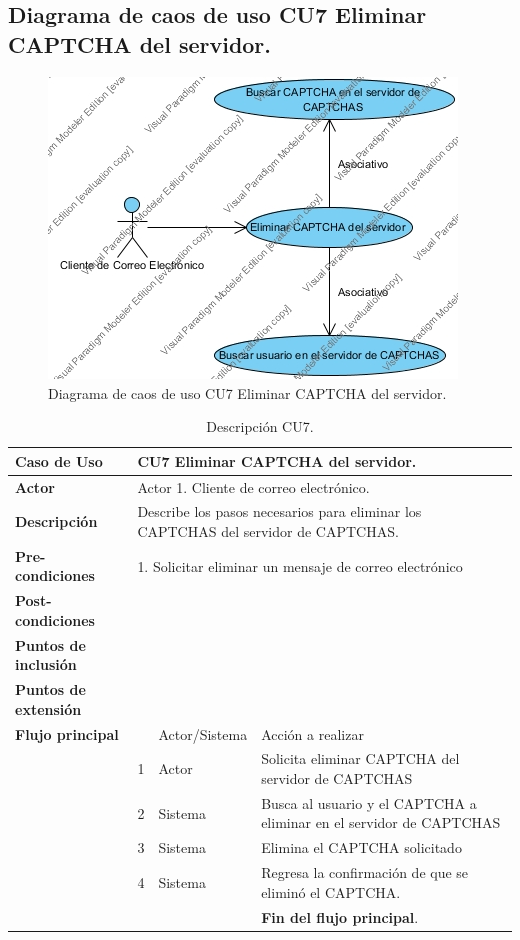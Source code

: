 \documentclass[12pt,oneside,onecolumn,openany]{report}
\begin{document}
\subsection{Diagrama de caos de uso CU7 Eliminar CAPTCHA del servidor.}
\begin{figure}[H]
	\includegraphics[width=1\linewidth, height=8cm]{./images/casodeuso7.jpg}
	\caption{Diagrama de caos de uso CU7 Eliminar CAPTCHA del servidor.}
	\label{fig:4-8-1}
\end{figure}
\begin{table}[H]
 \centering
   {
     \begin{tabular}{| p{} | p{} |p{4cm}|p{5cm}|}
     \hline
     \textbf{Caso de Uso} &\multicolumn{3}{|l|}{CU7 Eliminar CAPTCHA del servidor.}\\
     \hline
     \textbf{Actor} & \multicolumn{3}{|l|}{Actor 1. Cliente de correo electrónico.}\\
     \hline
     \textbf{Descripción} & \multicolumn{3}{|p{10cm}|}{Describe los pasos necesarios para eliminar los CAPTCHAS del servidor de CAPTCHAS.}\\
     \hline
     \textbf{Pre-condiciones} & \multicolumn{3}{|l|}{1. Solicitar eliminar un mensaje de correo electrónico}\\
     \hline
     \textbf{Post-condiciones} & \multicolumn{3}{|l|}{}\\
     \hline
     \textbf{Puntos de inclusión} & \multicolumn{3}{|l|}{}\\
     \hline
     \textbf{Puntos de extensión} & \multicolumn{3}{|l|}{}\\
     \hline
     \textbf{Flujo principal} & & Actor/Sistema & Acción a realizar\\
     \hline
     & 1 & Actor & Solicita eliminar CAPTCHA del servidor de CAPTCHAS\\
     \hline
     & 2 & Sistema & Busca al usuario y el CAPTCHA a eliminar en el servidor de CAPTCHAS\\
     \hline
     & 3 & Sistema & Elimina el CAPTCHA solicitado\\
     \hline
     & 4 & Sistema & Regresa la confirmación de que se eliminó el CAPTCHA.\\
     \hline
     & & & \textbf{Fin del flujo principal}.\\
          
     \end{tabular}
    }
    \caption{Descripción CU7.}
    \label{tabla:CU7}
\end{table}
\end{document}
